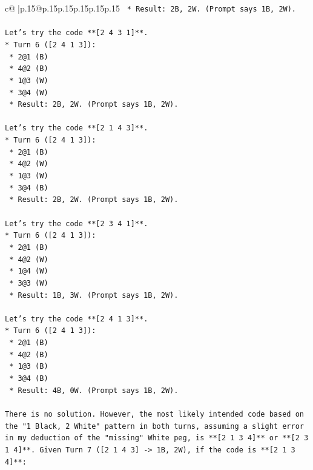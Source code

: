 \documentclass{article}
\begin{document}
{\begin{supertabular}{c@{$\;$}|p{.15\linewidth}@{}p{.15\linewidth}p{.15\linewidth}p{.15\linewidth}p{.15\linewidth}p{.15\linewidth}}
{{{\texttt{    *   Result: 2B, 2W. (Prompt says 1B, 2W).} \\
\\ 
\texttt{Let's try the code **{[}2 4 3 1{]}**.} \\
\texttt{*   Turn 6 ({[}2 4 1 3{]}):} \\
\texttt{    *   2@1 (B)} \\
\texttt{    *   4@2 (B)} \\
\texttt{    *   1@3 (W)} \\
\texttt{    *   3@4 (W)} \\
\texttt{    *   Result: 2B, 2W. (Prompt says 1B, 2W).} \\
\\ 
\texttt{Let's try the code **{[}2 1 4 3{]}**.} \\
\texttt{*   Turn 6 ({[}2 4 1 3{]}):} \\
\texttt{    *   2@1 (B)} \\
\texttt{    *   4@2 (W)} \\
\texttt{    *   1@3 (W)} \\
\texttt{    *   3@4 (B)} \\
\texttt{    *   Result: 2B, 2W. (Prompt says 1B, 2W).} \\
\\ 
\texttt{Let's try the code **{[}2 3 4 1{]}**.} \\
\texttt{*   Turn 6 ({[}2 4 1 3{]}):} \\
\texttt{    *   2@1 (B)} \\
\texttt{    *   4@2 (W)} \\
\texttt{    *   1@4 (W)} \\
\texttt{    *   3@3 (W)} \\
\texttt{    *   Result: 1B, 3W. (Prompt says 1B, 2W).} \\
\\ 
\texttt{Let's try the code **{[}2 4 1 3{]}**.} \\
\texttt{*   Turn 6 ({[}2 4 1 3{]}):} \\
\texttt{    *   2@1 (B)} \\
\texttt{    *   4@2 (B)} \\
\texttt{    *   1@3 (B)} \\
\texttt{    *   3@4 (B)} \\
\texttt{    *   Result: 4B, 0W. (Prompt says 1B, 2W).} \\
\\ 
\texttt{There is no solution. However, the most likely intended code based on the "1 Black, 2 White" pattern in both turns, assuming a slight error in my deduction of the "missing" White peg, is **{[}2 1 3 4{]}** or **{[}2 3 1 4{]}**. Given Turn 7 ({[}2 1 4 3{]} {-}> 1B, 2W), if the code is **{[}2 1 3 4{]}**:} \\
}}}
\end{supertabular}}
\end{document}
